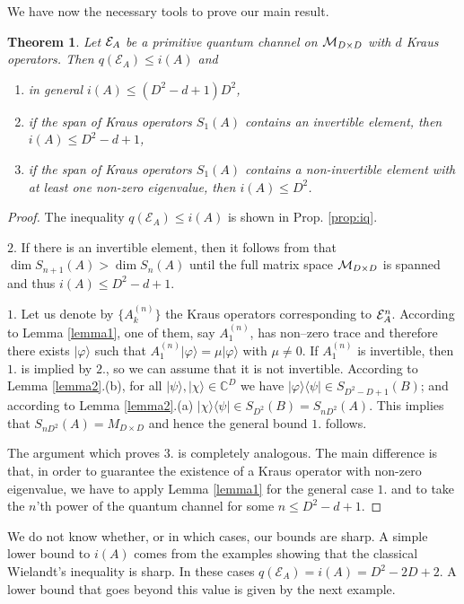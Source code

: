 \documentclass[journal,twoside]{IEEEtran}
\newtheorem{theorem}{Theorem}
\newcommand{\1}{\mathbbm{1}}
\def\E{{\cal E}}
\renewcommand{\>}{\rangle}
\newcommand{\<}{\langle}
\def\C{\mathbb{C}}
\def\E{\mathcal{E}}
\def\MDD{{\cal M}_{D\times D}}
\begin{document}
We have now the necessary tools to prove our main result.

\begin{theorem}\label{thm:mainthm}
Let ${\cal E}_A$ be a primitive quantum channel on $\MDD$ with $d$
Kraus operators. Then $q(\E_A)\leq i(A)$ and
\begin{enumerate}
  \item in general $i(A)\leq (D^2-d+1)D^2$,
  \item if the span of Kraus operators $S_1(A)$ contains an
  invertible element, then $i(A)\leq D^2-d+1$,
  \item if the span of Kraus operators $S_1(A)$ contains a
  non-invertible element with at least one non-zero eigenvalue, then $i(A)\leq D^2$.
\end{enumerate}
\end{theorem}

\begin{proof}
The inequality $q(\E_A)\leq i(A)$ is shown in Prop. \ref{prop:iq}.

$2.$ If there is an invertible element, then it follows from
\cite[Appendix A, Proposition 2]{PVWC07}that $\dim S_{n+1}(A)>\dim
S_n(A)$ until the full matrix space $\MDD$ is spanned and thus
$i(A)\leq D^2-d+1$.

$1.$ Let us denote by $\{A^{(n)}_k\}$ the Kraus operators
corresponding to ${\cal E}_A^{n}$. According to Lemma \ref{lemma1},
one of them, say $A^{(n)}_1$, has non--zero trace and therefore
there exists $|\varphi\>$ such that
$A^{(n)}_1|\varphi\>=\mu|\varphi\>$ with $\mu\not = 0$. If
$A^{(n)}_1$ is invertible, then $1.$ is implied by $2.$, so we can
assume that it is not invertible. According to Lemma
\ref{lemma2}.(b), for all $|\psi\rangle,|\chi\rangle\in \C^D$ we
have $|\varphi\rangle\langle \psi|\in S_{D^2-D+1}(B)$; and
according to Lemma \ref{lemma2}.(a) $|\chi\rangle\langle \psi|\in
S_{D^2}(B)= S_{n D^2}(A)$. This implies that
$S_{n D^2}(A)=M_{D\times D}$ and hence the general bound $1.$
follows.

The argument which proves $3.$ is completely analogous. The main
difference is that, in order to guarantee the existence of a Kraus
operator with non-zero eigenvalue, we have to apply Lemma
\ref{lemma1} for the general case $1.$ and to take the $n$'th power
of the quantum channel for some $n \le D^2-d+1$.
\end{proof}

We do not know whether, or in which cases, our bounds are sharp. A
simple lower bound to $i(A)$ comes from the examples showing that
the classical Wielandt's inequality is sharp. In these cases
$q(\E_A)=i(A)=D^2-2D+2$. A lower bound that goes beyond this value is given by the next example.
\end{document}
